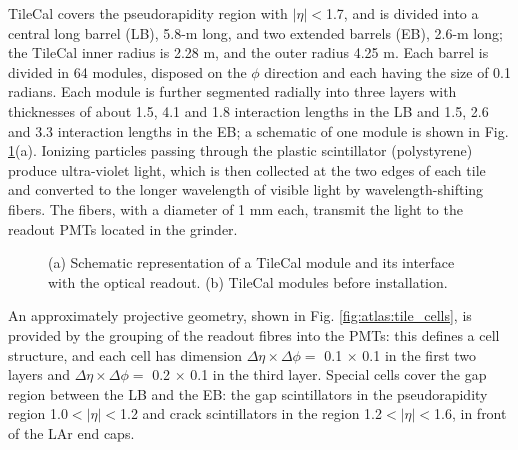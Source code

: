 TileCal covers the pseudorapidity region with $|\eta|<$1.7, and is divided into a central long barrel (LB), 5.8-m long, and two extended barrels (EB), 2.6-m long; the TileCal inner radius is 2.28 m, and the outer radius 4.25 m. Each barrel is divided in 64 modules, disposed on the $\phi$ direction and each having the size of 0.1 radians. Each module is further segmented radially into three layers with thicknesses of about 1.5, 4.1 and 1.8 interaction lengths in the LB and 1.5, 2.6 and 3.3 interaction lengths in the EB; a schematic of one module is shown in Fig. \ref{fig:atlas:tile}(a). Ionizing particles passing through the plastic scintillator (polystyrene) produce ultra-violet light, which is then collected at the two edges of each tile and converted to the longer wavelength of visible light by wavelength-shifting fibers. The fibers, with a diameter of 1 mm each, transmit the light to the readout PMTs located in the grinder.

\begin{figure}[ht]
\centering
{}
\caption{(a) Schematic representation of a TileCal module and its interface with the optical readout. (b) TileCal modules before installation.}
\label{fig:atlas:tile}
\end{figure}

An approximately projective geometry, shown in Fig. \ref{fig:atlas:tile_cells}, is provided by the grouping of the readout fibres into the PMTs: this defines a cell structure, and each cell has dimension $\Delta\eta \times \Delta\phi = $ 0.1 $\times$ 0.1 in the first two layers and $\Delta\eta \times \Delta\phi = $ 0.2 $\times$ 0.1 in the third layer. Special cells cover the gap region between the LB and the EB: the gap scintillators in the pseudorapidity region 1.0$<|\eta|<$1.2 and crack scintillators in the region 1.2$<|\eta|<$1.6, in front of the LAr end caps.

